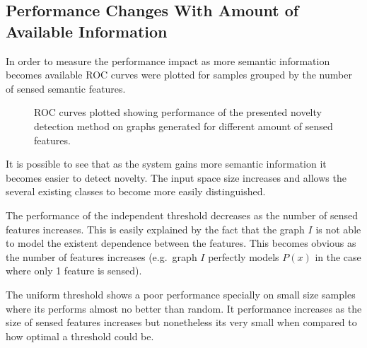 \subsection{Performance Changes With Amount of Available Information}
In order to measure the performance impact as more semantic information becomes
available ROC curves were plotted for samples grouped by the number of sensed
semantic features.

\begin{figure}[h]
\centering

\qquad
{}

\qquad
{}

\caption{\label{fig:synthetic-roc-breakdown}ROC curves plotted showing performance of the
         presented novelty detection method on graphs generated for different amount of
         sensed features.}
\end{figure}

It is possible to see that as the system gains more semantic information it
becomes easier to detect novelty. The input space size increases and allows the
several existing classes to become more easily distinguished.

The performance of the independent threshold decreases as the number of sensed
features increases. This is easily explained by the fact that the graph $I$ is not
able to model the existent dependence between the features. This becomes obvious
as the number of features increases (e.g.\ graph $I$ perfectly models $P(x)$ in the
case where only 1 feature is sensed).

The uniform threshold shows a poor performance specially on small size samples
where its performs almost no better than random.
It performance increases as the size of sensed features increases but nonetheless
its very small when compared to how optimal a threshold could be.

